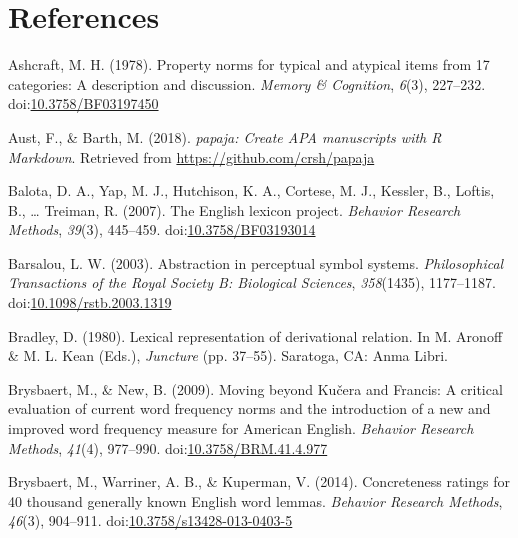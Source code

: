 \documentclass[english,,man]{apa6}
\begin{document}
\newpage

\hypertarget{references}{%
\section{References}\label{references}}

\setlength{\parindent}{-0.5in}
\setlength{\leftskip}{0.5in}

\hypertarget{refs}{}
\leavevmode\hypertarget{ref-Ashcraft1978a}{}%
Ashcraft, M. H. (1978). Property norms for typical and atypical items from 17 categories: A description and discussion. \emph{Memory \& Cognition}, \emph{6}(3), 227--232. doi:\href{https://doi.org/10.3758/BF03197450}{10.3758/BF03197450}

\leavevmode\hypertarget{ref-R-papaja}{}%
Aust, F., \& Barth, M. (2018). \emph{papaja: Create APA manuscripts with R Markdown}. Retrieved from \url{https://github.com/crsh/papaja}

\leavevmode\hypertarget{ref-Balota2007}{}%
Balota, D. A., Yap, M. J., Hutchison, K. A., Cortese, M. J., Kessler, B., Loftis, B., \ldots{} Treiman, R. (2007). The English lexicon project. \emph{Behavior Research Methods}, \emph{39}(3), 445--459. doi:\href{https://doi.org/10.3758/BF03193014}{10.3758/BF03193014}

\leavevmode\hypertarget{ref-Barsalou2003}{}%
Barsalou, L. W. (2003). Abstraction in perceptual symbol systems. \emph{Philosophical Transactions of the Royal Society B: Biological Sciences}, \emph{358}(1435), 1177--1187. doi:\href{https://doi.org/10.1098/rstb.2003.1319}{10.1098/rstb.2003.1319}

\leavevmode\hypertarget{ref-Bradley1980}{}%
Bradley, D. (1980). Lexical representation of derivational relation. In M. Aronoff \& M. L. Kean (Eds.), \emph{Juncture} (pp. 37--55). Saratoga, CA: Anma Libri.

\leavevmode\hypertarget{ref-Brysbaert2009}{}%
Brysbaert, M., \& New, B. (2009). Moving beyond Kučera and Francis: A critical evaluation of current word frequency norms and the introduction of a new and improved word frequency measure for American English. \emph{Behavior Research Methods}, \emph{41}(4), 977--990. doi:\href{https://doi.org/10.3758/BRM.41.4.977}{10.3758/BRM.41.4.977}

\leavevmode\hypertarget{ref-Brysbaert2013}{}%
Brysbaert, M., Warriner, A. B., \& Kuperman, V. (2014). Concreteness ratings for 40 thousand generally known English word lemmas. \emph{Behavior Research Methods}, \emph{46}(3), 904--911. doi:\href{https://doi.org/10.3758/s13428-013-0403-5}{10.3758/s13428-013-0403-5}
\end{document}

